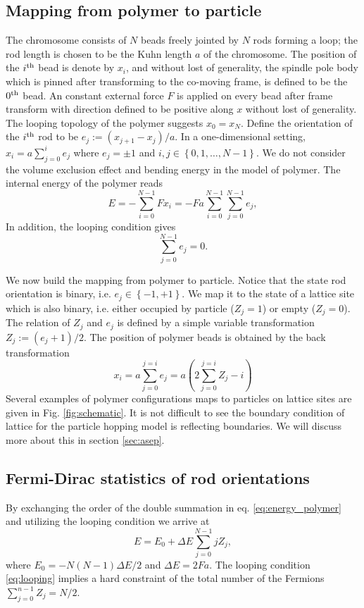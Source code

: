 \documentclass[aps,showpacs,twocolumn,floatfix,prx,superscriptaddress]{revtex4-1}
\begin{document}
\subsection{Mapping from polymer to particle}
\label{sec:mapping}
The chromosome consists of $N$ beads freely jointed by $N$ rods forming
a loop; the rod length is chosen to be the Kuhn length $a$ of the chromosome.
The position of the $i^{\rm th}$ bead is denote by $x_i$, and without lost of
generality, the spindle pole body which is pinned after transforming to the
co-moving frame, is defined to be the $0^{\rm th}$ bead. An constant external
force $F$ is applied on every bead after frame transform with direction defined
to be positive along $x$ without lost of generality. The looping topology of the
polymer suggests $x_0=x_N$. Define the orientation of the $i^{\rm th}$ rod to be
$e_j:=(x_{j+1} - x_{j})/a$.  In a one-dimensional setting, $x_i =
a\sum_{j=0}^{i} e_j$ where $e_j=\pm 1$ and $i,j \in \left\{0, 1, \ldots,
    N-1\right\}$. We do not consider the volume exclusion effect and bending
energy in the model of polymer. The internal energy of the polymer reads
\begin{equation}
    \label{eq:energy_polymer}
    E  = -\sum_{i=0}^{N-1} {Fx_i} = -Fa\sum_{i=0}^{N-1} \sum_{j=0}^{N-1}e_j, 
\end{equation}
In addition, the looping condition gives
\begin{equation}
    \label{eq:looping}
    \sum_{j=0}^{N-1} e_j = 0.
\end{equation}

We now build the mapping from polymer to particle. Notice that the state rod
orientation is binary, i.e. $e_j \in \left\{-1, +1\right\}$. We map it to the state of a
lattice site which is also binary, i.e. either occupied by particle ($Z_j = 1$)
or empty ($Z_j = 0$). The relation of $Z_j$ and $e_j$ is defined by a simple
variable transformation $Z_j := \left(e_j+1\right)/2$. The position of polymer
beads is obtained by the back transformation
\begin{equation}
    \label{eq:z2x}
    x_i = a \sum_{j=0}^{j=i}{e_j} = a\left(2\sum_{j=0}^{j=i}{Z_j} -i\right)
\end{equation}
Several examples of polymer configurations maps to particles on lattice sites are given
in Fig. \ref{fig:schematic}. It is not difficult to see the boundary condition of
lattice for the particle hopping model is reflecting boundaries. We will
discuss more about this in section \ref{sec:asep}.


\subsection{Fermi-Dirac statistics of rod orientations}
By exchanging the order of the double summation in eq.
\eqref{eq:energy_polymer} and utilizing the looping condition we arrive at 
\begin{equation}
    \label{eq:energy_particle}
    E = E_0 + \Delta E \sum_{j=0}^{N-1} j Z_j, 
\end{equation}
where $E_0= - N(N-1) \Delta E /2$ and $\Delta E = 2Fa$. The looping condition
\eqref{eq:looping} implies a hard constraint of the total number of the Fermions
$\sum_{j=0}^{n-1} Z_j = N/2$.
\end{document}
